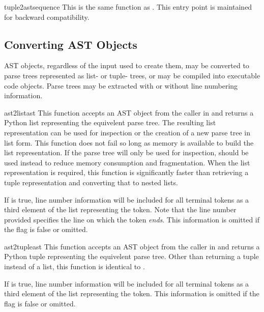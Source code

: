 \begin{funcdesc}{tuple2ast}{sequence}
This is the same function as .  This entry point
is maintained for backward compatibility.
\end{funcdesc}


\subsection{Converting AST Objects}

AST objects, regardless of the input used to create them, may be
converted to parse trees represented as list- or tuple- trees, or may
be compiled into executable code objects.  Parse trees may be
extracted with or without line numbering information.

\begin{funcdesc}{ast2list}{ast}
This function accepts an AST object from the caller in
 and returns a Python list representing the
equivelent parse tree.  The resulting list representation can be used
for inspection or the creation of a new parse tree in list form.  This
function does not fail so long as memory is available to build the
list representation.  If the parse tree will only be used for
inspection,  should be used instead to reduce memory
consumption and fragmentation.  When the list representation is
required, this function is significantly faster than retrieving a
tuple representation and converting that to nested lists.

If  is true, line number information will be
included for all terminal tokens as a third element of the list
representing the token.  Note that the line number provided specifies
the line on which the token \emph{ends\/}.  This information is
omitted if the flag is false or omitted.
\end{funcdesc}

\begin{funcdesc}{ast2tuple}{ast}
This function accepts an AST object from the caller in
 and returns a Python tuple representing the
equivelent parse tree.  Other than returning a tuple instead of a
list, this function is identical to .

If  is true, line number information will be
included for all terminal tokens as a third element of the list
representing the token.  This information is omitted if the flag is
false or omitted.
\end{funcdesc}

